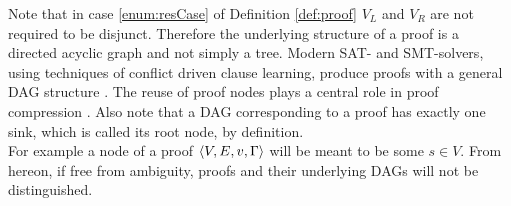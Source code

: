 \noindent
Note that in case \ref{enum:resCase} of Definition \ref{def:proof} $V_L$ and $V_R$ are not required to be disjunct. 
Therefore the underlying structure of a proof is a directed acyclic graph and not simply a tree. 
Modern SAT- and SMT-solvers, using techniques of conflict driven clause learning, produce proofs with a general DAG structure \cite{Bouton2009,Biere2009}.
The reuse of proof nodes plays a central role in proof compression \cite{Fontaine2011}.
Also note that a DAG corresponding to a proof has exactly one sink, which is called its root node, by definition.\\
For example a node of a proof $\langle V,E,v,\Gamma \rangle$ will be meant to be some $s \in V$.
From hereon, if free from ambiguity, proofs and their underlying DAGs will not be distinguished. 
